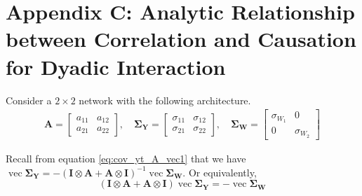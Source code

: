 \documentclass{article}
\begin{document}

\section*{Appendix C: Analytic Relationship between Correlation and Causation for Dyadic Interaction}
\label{app:appC}
\renewcommand{\theequation}{C-\arabic{equation}}
\setcounter{equation}{0}

Consider a $2 \times2$ network with the following architecture.
\begin{equation}
\begin{aligned}
\mathbf{A}=
\begin{bmatrix}
a_{11} & a_{12} \\
a_{21} & a_{22}
\end{bmatrix}, \quad
\mathbf{\Sigma_\mathbf{Y}}=
\begin{bmatrix}
\sigma_{11} & \sigma_{12} \\
\sigma_{21} & \sigma_{22}
\end{bmatrix}, \quad
\mathbf{\Sigma_\mathbf{W}}=
\begin{bmatrix}
\sigma_{W_1} & 0 \\
0 & \sigma_{W_2}
\end{bmatrix}
\end{aligned}
\end{equation}


Recall from equation \ref{eq:cov_yt_A_vec1} that we have $\operatorname{vec} \mathbf{\Sigma_Y} =- {(\mathbf{I} \otimes \mathbf{A} + \mathbf{A} \otimes \mathbf{I})}^{-1} \operatorname{vec} \mathbf{\Sigma}_\mathbf{W}$. Or equivalently,
\begin{equation}
 {(\mathbf{I} \otimes \mathbf{A} + \mathbf{A} \otimes \mathbf{I})} \operatorname{vec} \mathbf{\Sigma_Y} =-  \operatorname{vec} \mathbf{\Sigma}_\mathbf{W}
\label{eq:lya_vec_full}
\end{equation}
\end{document}
